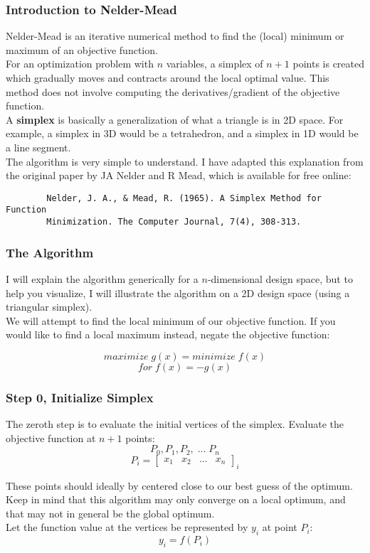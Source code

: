 \documentclass[aspectratio=169]{beamer}
\begin{document}
	\begin{frame}[fragile]
		\frametitle{Introduction to Nelder-Mead}
		Nelder-Mead is an iterative numerical method to find the (local) minimum or maximum of an objective function.\\[\baselineskip]
		
		For an optimization problem with $n$ variables, a simplex of $n+1$ points is created which gradually moves and contracts around the local optimal value. This method does not involve computing the derivatives/gradient of the objective function.\\[\baselineskip]
		
		A \textbf{simplex} is basically a generalization of what a triangle is in 2D space. For example, a simplex in 3D would be a tetrahedron, and a simplex in 1D would be a line segment.\\[\baselineskip]
		
		The algorithm is very simple to understand. I have adapted this explanation from the original paper by JA Nelder and R Mead, which is available for free online:\\[\baselineskip]
		
		\begin{verbatim}
		Nelder, J. A., & Mead, R. (1965). A Simplex Method for Function 
		Minimization. The Computer Journal, 7(4), 308-313.	
		\end{verbatim}
	\end{frame}

	\begin{frame}
		\frametitle{The Algorithm}
		I will explain the algorithm generically for a $n$-dimensional design space, but to help you visualize, I will illustrate the algorithm on a 2D design space (using a triangular simplex).\\[\baselineskip]
		
		We will attempt to find the local minimum of our objective function. If you would like to find a local maximum instead, negate the objective function:
		
		$$ maximize \; g(x) = minimize \; f(x)$$
		$$ for \; f(x)=-g(x) $$	
		
	\end{frame}

	\begin{frame}
		\frametitle{Step 0, Initialize Simplex}
		The zeroth step is to evaluate the initial vertices of the simplex. Evaluate the objective function at $n+1$ points:
		$$ P_0, P_1, P_2, \; ... \; P_n $$
		$$ P_i = \begin{bmatrix} x_1 & x_2 & ... & x_n \end{bmatrix}_i $$

		These points should ideally by centered close to our best guess of the optimum.		\\[\baselineskip]
		Keep in mind that this algorithm may only converge on a local optimum, and that may not in general be the global optimum. \\[\baselineskip]
		Let the function value at the vertices be represented by $y_i$ at point $P_i$:
		$$ y_i=f(P_i) $$
	\end{frame}
\end{document}
